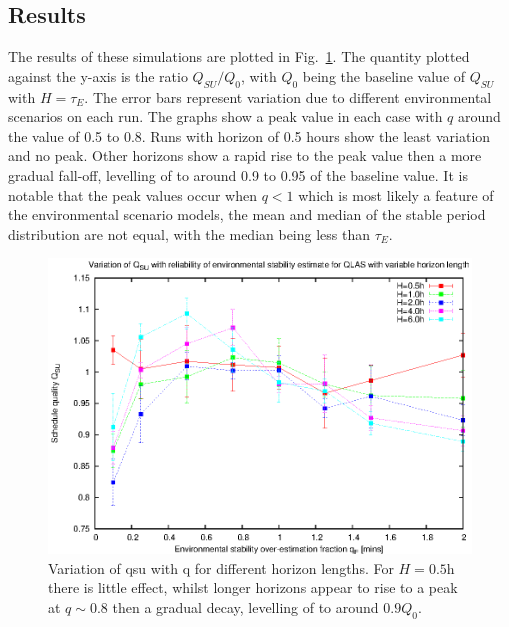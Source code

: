 \subsection{Results}
The results of these simulations are plotted in Fig.~\ref{fig:reliable}. The quantity plotted against the y-axis is the ratio $Q_{SU}/Q_0$, with $Q_0$ being the baseline value of $Q_{SU}$ with $H=\tau_E$. The error bars represent variation due to different environmental scenarios on each run. The graphs show a peak value in each case with $q$ around the value of 0.5 to 0.8. Runs with horizon of 0.5 hours show the least variation and no peak. Other horizons show a rapid rise to the peak value then a more gradual fall-off, levelling of to around 0.9 to 0.95 of the baseline value. It is notable that the peak values occur when $q < 1$ which is most likely a feature of the environmental scenario models, the mean and median of the stable period distribution are not equal, with the median being less than $\tau_E$.

\begin{figure}[htp]
\begin{center}
  \includegraphics[scale=1.0, angle=0]{figures/horiz_reliability.eps}
  \caption[Variation of qsu with q for different horizon lengths.]
  {Variation of qsu with q for different horizon lengths. For $H=0.5$h there is little effect, whilst longer horizons appear to rise to a peak at $q \sim 0.8$ then a gradual decay, levelling of to around $0.9Q_0$.}
\label{fig:reliable}
\end{center}
\end{figure}
